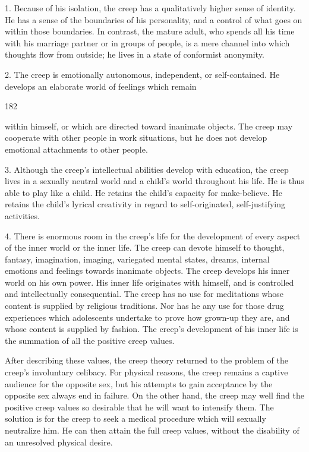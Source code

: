\documentclass[10pt,twoside]{memoir}
\begin{document}
\begin{enumerate}
{{1. Because of his isolation, the creep has a qualitatively higher sense of 
identity. He has a sense of the boundaries of his personality, and a control of 
what goes on within those boundaries. In contrast, the mature adult, who 
spends all his time with his marriage partner or in groups of people, is a mere 
channel into which thoughts flow from outside; he lives in a state of 
conformist anonymity. 

2. The creep is emotionally autonomous, independent, or 
self-contained. He develops an elaborate world of feelings which remain 


182 


within himself, or which are directed toward inanimate objects. The creep 
may cooperate with other people in work situations, but he does not develop 
emotional attachments to other people. 

3. Although the creep's intellectual abilities develop with education, 
the creep lives in a sexually neutral world and a child's world throughout his 
life. He is thus able to play like a child. He retains the child's capacity for 
make-believe. He retains the child's lyrical creativity in regard to 
self-originated, self-justifying activities. 

4. There is enormous room in the creep's life for the development of 
every aspect of the inner world or the inner life. The creep can devote 
himself to thought, fantasy, imagination, imaging, variegated mental states, 
dreams, internal emotions and feelings towards inanimate objects. The creep 
develops his inner world on his own power. His inner life originates with 
himself, and is controlled and intellectually consequential. The creep has no 
use for meditations whose content is supplied by religious traditions. Nor has 
he any use for those drug experiences which adolescents undertake to prove 
how grown-up they are, and whose content is supplied by fashion. The 
creep's development of his inner life is the summation of all the positive 
creep values. 

After describing these values, the creep theory returned to the problem 
of the creep's involuntary celibacy. For physical reasons, the creep remains a 
captive audience for the opposite sex, but his attempts to gain acceptance by 
the opposite sex always end in failure. On the other hand, the creep may 
well find the positive creep values so desirable that he will want to intensify 
them. The solution is for the creep to seek a medical procedure which will 
sexually neutralize him. He can then attain the full creep values, without the 
disability of an unresolved physical desire. 

}}
\end{enumerate}
\end{document}
